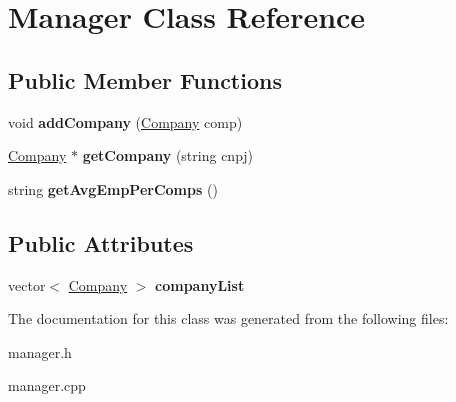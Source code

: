 \hypertarget{classManager}{}\section{Manager Class Reference}
\label{classManager}
\subsection*{Public Member Functions}
\begin{DoxyCompactItemize}
\item 
void {\bfseries add\+Company} (\hyperlink{classCompany}{Company} comp)\hypertarget{classManager_a94e3abb935cf6458f8e3dde0c3bf50f4}{}\label{classManager_a94e3abb935cf6458f8e3dde0c3bf50f4}

\item 
\hyperlink{classCompany}{Company} $\ast$ {\bfseries get\+Company} (string cnpj)\hypertarget{classManager_a7dca4f8c70562233457bb1032de61b99}{}\label{classManager_a7dca4f8c70562233457bb1032de61b99}

\item 
string {\bfseries get\+Avg\+Emp\+Per\+Comps} ()\hypertarget{classManager_a3240057f906e4d21b7c157dcc1c6166c}{}\label{classManager_a3240057f906e4d21b7c157dcc1c6166c}

\end{DoxyCompactItemize}
\subsection*{Public Attributes}
\begin{DoxyCompactItemize}
\item 
vector$<$ \hyperlink{classCompany}{Company} $>$ {\bfseries company\+List}\hypertarget{classManager_a9cb3f5923de83cc4eb571de010dc90f7}{}\label{classManager_a9cb3f5923de83cc4eb571de010dc90f7}

\end{DoxyCompactItemize}


The documentation for this class was generated from the following files\+:\begin{DoxyCompactItemize}
\item 
manager.\+h\item 
manager.\+cpp\end{DoxyCompactItemize}
